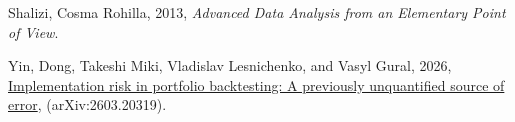 \documentclass[
  11pt,
  letterpaper,
  DIV=12,
  numbers=noendperiod]{scrartcl}
\newlength{\cslhangindent}
\newenvironment{CSLReferences}[2] %
 {\begin{list}{}{%
  \setlength{\itemindent}{0pt}
  \setlength{\leftmargin}{0pt}
  \setlength{\parsep}{0pt}
  \ifodd #1
   \setlength{\leftmargin}{\cslhangindent}
   \setlength{\itemindent}{-1\cslhangindent}
  \fi
  \setlength{\itemsep}{#2\baselineskip}}}
 {\end{list}}
\numberwithin{equation}{section}
\numberwithin{figure}{section}
\numberwithin{table}{section}
\begin{document}
\begin{CSLReferences}{0}{1}
Shalizi, Cosma Rohilla, 2013, \emph{Advanced Data Analysis from an
Elementary Point of View}.

Yin, Dong, Takeshi Miki, Vladislav Lesnichenko, and Vasyl Gural, 2026,
\href{https://doi.org/10.48550/arXiv.2603.20319}{Implementation risk in
portfolio backtesting: A previously unquantified source of error},
(arXiv:2603.20319).

\end{CSLReferences}
\end{document}
